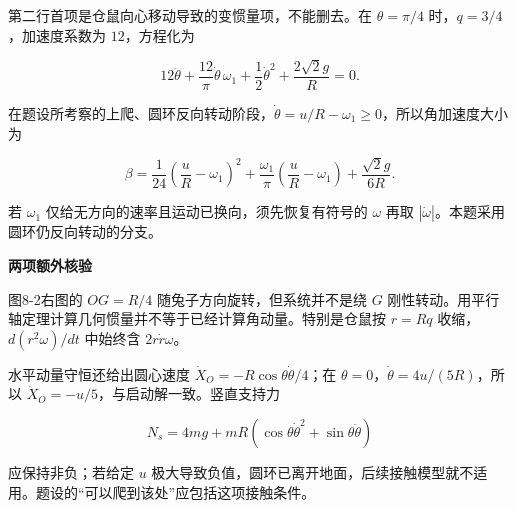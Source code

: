 \documentclass[12pt,a4paper,UTF8]{ctexart}
\begin{document}
第二行首项是仓鼠向心移动导致的变惯量项，不能删去。在 \(\theta=\pi/4\)
时，\(q=3/4\)，加速度系数为 \(12\)，方程化为

\[12\ddot\theta+\frac{12}\pi\dot\theta\,\omega_1
+\frac12\dot\theta^2+\frac{2\sqrt2g}R=0.\]

在题设所考察的上爬、圆环反向转动阶段，\(\dot\theta=u/R-\omega_1\ge0\)，所以角加速度大小为

\[\boxed{\beta=
\frac1{24}\left(\frac uR-\omega_1\right)^2
+\frac{\omega_1}\pi\left(\frac uR-\omega_1\right)
+\frac{\sqrt2g}{6R}}.\]

若 \(\omega_1\) 仅给无方向的速率且运动已换向，须先恢复有符号的
\(\omega\) 再取 \(|\dot\omega|\)。本题采用圆环仍反向转动的分支。

\textbf{两项额外核验}

图8-2右图的 \(OG=R/4\) 随兔子方向旋转，但系统并不是绕 \(G\)
刚性转动。用平行轴定理计算几何惯量并不等于已经计算角动量。特别是仓鼠按
\(r=Rq\) 收缩，\(d(r^2\omega)/dt\) 中始终含 \(2r\dot r\omega\)。

水平动量守恒还给出圆心速度 \(\dot X_O=-R\cos\theta\dot\theta/4\)；在
\(\theta=0\)，\(\dot\theta=4u/(5R)\)，所以
\(\dot X_O=-u/5\)，与启动解一致。竖直支持力

\[N_s=4mg+mR(\cos\theta\dot\theta^2+\sin\theta\ddot\theta)\]

应保持非负；若给定 \(u\)
极大导致负值，圆环已离开地面，后续接触模型就不适用。题设的``可以爬到该处''应包括这项接触条件。
\end{document}
